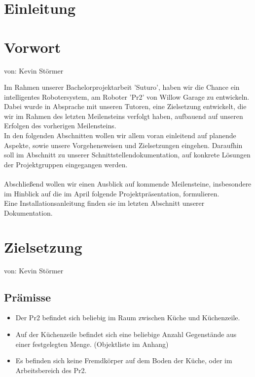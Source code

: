 \documentclass{suturo}
\begin{document}

\makeatletter
\newcommand{\chapterauthor}[1]{%
  {\parindent0pt\vspace*{-27pt}%
  \linespread{0}\small\begin{flushright}von: #1\end{flushright}%
  \par\nobreak\vspace*{0pt}}
  \@afterheading%
}
\makeatother


\section*{Einleitung}
\section{Vorwort}
\chapterauthor{Kevin Störmer}
Im Rahmen unserer Bachelorprojektarbeit 'Suturo', haben wir die Chance ein intelligentes Robotersystem, am Roboter 'Pr2' von Willow Garage zu entwickeln. \\
Dabei wurde in Absprache mit unseren Tutoren, eine Zielsetzung entwickelt, die wir im Rahmen des letzten Meilensteins verfolgt haben, aufbauend auf unseren Erfolgen des vorherigen Meilensteins. \\
In den folgenden Abschnitten wollen wir allem voran einleitend auf planende Aspekte, sowie unsere Vorgehensweisen und Zielsetzungen eingehen. Daraufhin soll im Abschnitt zu unserer Schnittstellendokumentation, auf konkrete Lösungen der Projektgruppen eingegangen werden.\\ ~ \\
Abschließend wollen wir einen Ausblick auf kommende Meilensteine, insbesondere im Hinblick auf die im April folgende Projektpräsentation, formulieren.\\
Eine Installationsanleitung finden sie im letzten Abschnitt unserer Dokumentation.



\newpage

\section{Zielsetzung}
\chapterauthor{Kevin Störmer}
\subsection{Prämisse}
\begin{itemize}
\item Der Pr2 befindet sich beliebig im Raum zwischen Küche und Küchenzeile.
\item Auf der Küchenzeile befindet sich eine beliebige Anzahl Gegenstände aus einer festgelegten Menge. (Objektliste im Anhang)
\item Es befinden sich keine Fremdkörper auf dem Boden der Küche, oder im Arbeitsbereich des Pr2.
\end{itemize}
\end{document}
